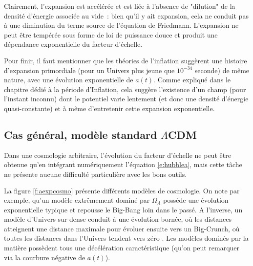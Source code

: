 Clairement, l'expansion est accélérée et est liée à l'absence de "dilution" de la densité d'énergie associée au vide~: bien qu'il y ait expansion, cela ne conduit pas à une diminution du terme source de l'équation de Friedmann. L'expansion ne peut être tempérée sous forme de loi de puissance douce et produit une dépendance exponentielle du facteur d'échelle. 

Pour finir, il faut mentionner que les théories de l'inflation suggèrent une histoire d'expansion primordiale (pour un Univers plus jeune que $10^{-34}$ seconde) de même nature, avec une évolution exponentielle de $a(t)$.  Comme expliqué dans le chapitre dédié à la période d'Inflation, cela suggère l'existence d'un champ (pour l'instant inconnu) dont le potentiel varie lentement (et donc une densité d'énergie quasi-constante) et à même d'entretenir cette expansion exponentielle.

\subsection{Cas général, modèle standard $\Lambda$CDM }
Dans une cosmologie arbitraire, l'évolution du facteur d'échelle ne peut être obtenue qu'en intégrant numériquement l'équation \ref{e:hubblea}, mais cette tâche ne présente aucune difficulté particulière avec les bons outils. 

La figure \ref{f:aexpcosmo} présente différents modèles de cosmologie. On note par exemple, qu'un modèle extrêmement dominé par $\Omega_\Lambda$ possède une évolution exponentielle typique et repousse le Big-Bang loin dans le passé. A l'inverse, un modèle d'Univers sur-dense conduit à une évolution bornée, où les distances atteignent une distance maximale pour évoluer ensuite vers un Big-Crunch, où toutes les distances dans l'Univers tendent vers zéro . Les modèles dominés par la matière possèdent tous une décélération caractéristique (qu'on peut remarquer via la courbure négative de $a(t)$).

